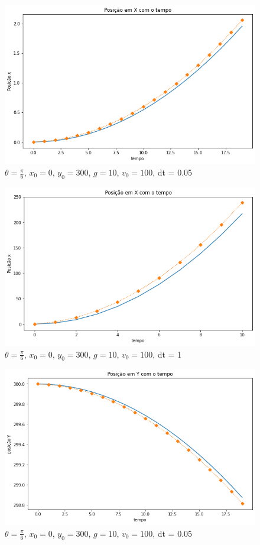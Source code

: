 \documentclass[12pt]{article}
\begin{document}
\begin{figure}[H]
  \centering
  \includegraphics[scale = 0.6]{imagens/(blocoemrampa)posicaoxdt=0.05tf=1.png}
  \caption{$\theta = \frac{\pi}{6}$, $x_0 = 0$, $y_0 = 300$, $g = 10$, $v_0 = 100$, dt = 0.05}
\end{figure}
\begin{figure}[H]
  \centering
  \includegraphics[scale = 0.6]{imagens/(blocoemrampa)posicaoxdt=1tf=10.png}
  \caption{$\theta = \frac{\pi}{6}$, $x_0 = 0$, $y_0 = 300$, $g = 10$, $v_0 = 100$, dt = 1}
\end{figure}
\begin{figure}[H]
  \centering
  \includegraphics[scale = 0.6]{imagens/(blocoemrampa)posicaoydt=0.05tf=1.png}
  \caption{$\theta = \frac{\pi}{6}$, $x_0 = 0$, $y_0 = 300$, $g = 10$, $v_0 = 100$, dt = 0.05}
\end{figure}
\end{document}
